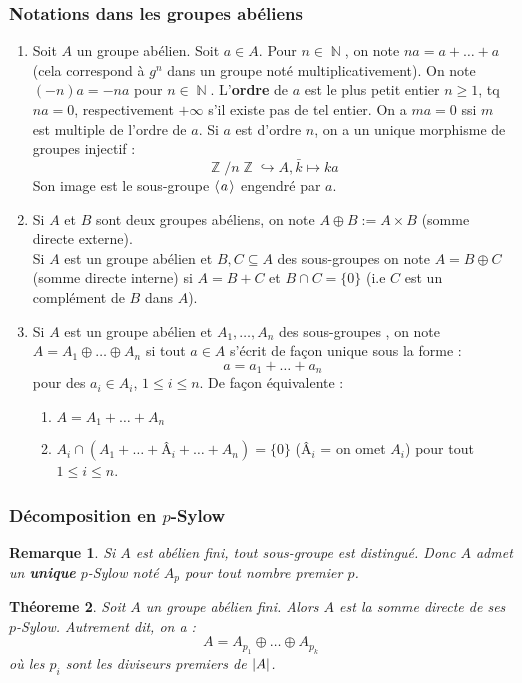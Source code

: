 \documentclass[a4paper, oneside]{report}
\theoremstyle{break}
\newtheorem{thm}{Théoreme}[section] %
\newtheorem{remar}[thm]{Remarque}
\newcommand{\sg}{sous-groupe }
\newcommand{\sgs}{sous-groupes }
\newcommand{\x}{\times}
\newcommand{\inj}{\hookrightarrow}
\DeclareMathOperator{\N}{\mathbb{N}}
\DeclareMathOperator{\Z}{\mathbb{Z}}
\DeclarePairedDelimiter\abs{\lvert}{\rvert}%
\newcommand{\pro}[1]{\langle\hspace{0.1em}#1\hspace{0.1em}\rangle}
\newcommand{\gen}{\pro}
\begin{document}
\subsubsection{Notations dans les groupes abéliens}
\begin{enumerate}
\item Soit $A$ un groupe abélien. Soit $a\in A$. Pour $n\in \N$, on note $na = a+\ldots+a$ (cela correspond à $g^n$ dans un groupe noté multiplicativement). On note $(-n)a=-na$ pour $n\in\N$. L'\textbf{ordre} de $a$ est le plus petit entier $n\geq 1$, tq $na=0$, respectivement $+\infty$ s'il existe pas de tel entier. On a $ma=0$ ssi $m$ est multiple de l'ordre de $a$. Si $a$ est d'ordre $n$, on a un unique morphisme de groupes injectif :
$$\Z/n\Z\inj A, \bar{k}\mapsto ka$$
Son image est le \sg $\gen{a}$ engendré par $a$.

\item Si $A$ et $B$ sont deux groupes abéliens, on note $A\oplus B := A\x B$ (somme directe externe).\\
Si $A$ est un groupe abélien et $B,C \subseteq A$ des \sgs on note $A=B\oplus C$ (somme directe interne) si $A=B+C$ et $B\cap C = \{0\}$ (i.e $C$ est un complément de $B$ dans $A$).\\

\item Si $A$ est un groupe abélien et $A_1,\ldots, A_n$ des \sgs, on note $A=A_1\oplus \ldots \oplus A_n$ si tout $a\in A$ s'écrit de façon unique sous la forme :
$$a = a_1+\ldots+ a_n$$
pour des $a_i \in A_i$, $1\leq i \leq n$. De façon équivalente :
\begin{enumerate}
\item $A=A_1+\ldots + A_n$
\item $A_i\cap  (A_1+\ldots + Â_i+\ldots + A_n)= \{0\}$ ($Â_i$ = on omet $A_i$) pour tout $1\leq i \leq n$.
\end{enumerate}
\end{enumerate}

\subsubsection{Décomposition en $p$-Sylow}

\begin{remar}
Si $A$ est abélien fini, tout \sg est distingué. Donc $A$ admet un \textbf{unique} $p$-Sylow noté $A_p$ pour tout nombre premier $p$.
\end{remar}

\begin{thm}
Soit $A$ un groupe abélien fini. Alors $A$ est la somme directe de ses $p$-Sylow. Autrement dit, on a :
$$A=A_{p_1}\oplus \ldots \oplus A_{p_k}$$
où les $p_i$ sont les diviseurs premiers de $\abs{A}$. 
\end{thm}
\end{document}
